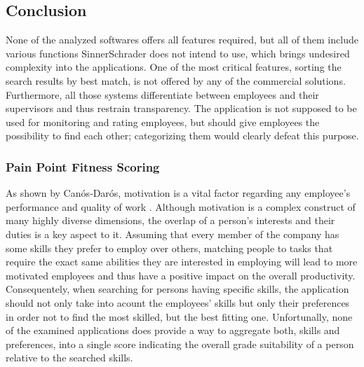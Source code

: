 \subsection{Conclusion}
None of the analyzed softwares offers all features required, but all of them include various functions SinnerSchrader does not intend to use, which brings undesired complexity into the applications.
One of the most critical features, sorting the search results by best match, is not offered by any of the commercial solutions.
Furthermore, all those systems differentiate between employees and their supervisors and thus restrain transparency. The application is not supposed to be used for monitoring and rating employees, but should give employees the possibility to find each other; categorizing them would clearly defeat this purpose.

\subsubsection{Pain Point Fitness Scoring}
As shown by Canós‐Darós, motivation is a vital factor regarding any employee's performance and quality of work \cite{CanosDaros2013}.
Although motivation is a complex construct of many highly diverse dimensions, the overlap of a person's interests and their duties is a key aspect to it.
Assuming that every member of the company has some skills they prefer to employ over others, matching people to tasks that require the exact same abilities they are interested in employing will lead to more motivated employees and thus have a positive impact on the overall productivity.
Consequentely, when searching for persons having specific skills, the application should not only take into acount the employees' skills but only their preferences in order not to find the most skilled, but the best fitting one. Unfortunally, none of the examined applications does provide a way to aggregate both, skills and preferences, into a single score indicating the overall grade suitability of a person relative to the searched skills.
